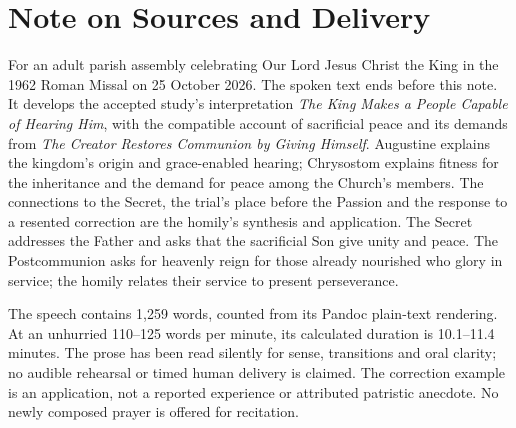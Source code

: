 \section{Note on Sources and Delivery}
For an adult parish assembly celebrating Our Lord Jesus Christ the King in the 1962 Roman Missal on 25 October 2026. The spoken text ends before this note. It develops the accepted study's interpretation \emph{The King Makes a People Capable of Hearing Him}, with the compatible account of sacrificial peace and its demands from \emph{The Creator Restores Communion by Giving Himself}. Augustine explains the kingdom's origin and grace-enabled hearing; Chrysostom explains fitness for the inheritance and the demand for peace among the Church's members. The connections to the Secret, the trial's place before the Passion and the response to a resented correction are the homily's synthesis and application. The Secret addresses the Father and asks that the sacrificial Son give unity and peace. The Postcommunion asks for heavenly reign for those already nourished who glory in service; the homily relates their service to present perseverance.

The speech contains 1,259 words, counted from its Pandoc plain-text rendering. At an unhurried 110--125 words per minute, its calculated duration is 10.1--11.4 minutes. The prose has been read silently for sense, transitions and oral clarity; no audible rehearsal or timed human delivery is claimed. The correction example is an application, not a reported experience or attributed patristic anecdote. No newly composed prayer is offered for recitation.

